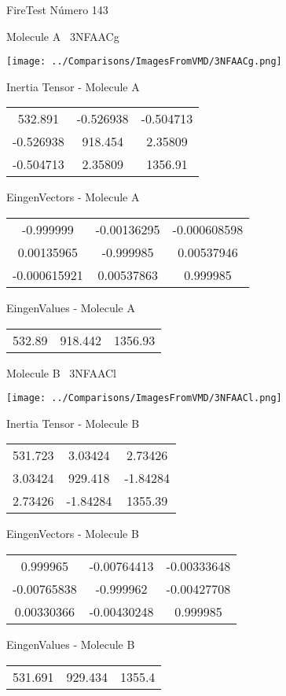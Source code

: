 \vtab[-3cm]
\begin{center}
{\large FireTest \tab Número 143}
\end{center}
\begin{multicols}{2}
\begin{center}

Molecule A \
3NFAACg

\texttt{[image: ../Comparisons/ImagesFromVMD/3NFAACg.png]}

Inertia Tensor - Molecule A \\
\begin{tabular}{|c c c|}
532.891	 & 	-0.526938	 & 	-0.504713	 \\
-0.526938	 & 	918.454	 & 	2.35809	 \\
-0.504713	 & 	2.35809	 & 	1356.91
\end{tabular}

\vtab
 EingenVectors - Molecule A     \\
\begin{tabular}{|c c c|}
-0.999999	 & 	-0.00136295	 & 	-0.000608598	 \\
0.00135965	 & 	-0.999985	 & 	0.00537946	 \\
-0.000615921	 & 	0.00537863	 & 	0.999985
\end{tabular}

\vtab
 EingenValues - Molecule A     \\
\begin{tabular}{|c c c|}
532.89	 & 	918.442	 & 	1356.93	 \\
\end{tabular}
\columnbreak

Molecule B \
3NFAACl

\texttt{[image: ../Comparisons/ImagesFromVMD/3NFAACl.png]}

Inertia Tensor - Molecule B \\
\begin{tabular}{|c c c|}
531.723	 & 	3.03424	 & 	2.73426	 \\
3.03424	 & 	929.418	 & 	-1.84284	 \\
2.73426	 & 	-1.84284	 & 	1355.39
\end{tabular}

\vtab
 EingenVectors - Molecule B     \\
\begin{tabular}{|c c c|}
0.999965	 & 	-0.00764413	 & 	-0.00333648	 \\
-0.00765838	 & 	-0.999962	 & 	-0.00427708	 \\
0.00330366	 & 	-0.00430248	 & 	0.999985
\end{tabular}

\vtab
 EingenValues - Molecule B     \\
\begin{tabular}{|c c c|}
531.691	 & 	929.434	 & 	1355.4	 \\
\end{tabular}

\end{center}
\end{multicols}

